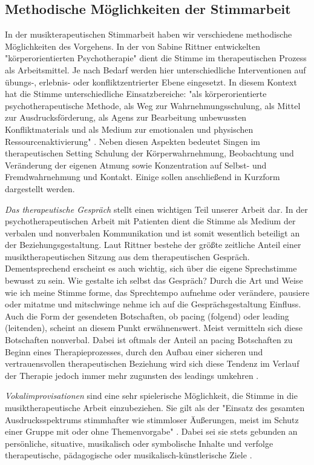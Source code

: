 \subsection{Methodische Möglichkeiten der Stimmarbeit}

In der musikterapeutischen Stimmarbeit haben wir verschiedene methodische Möglichkeiten des Vorgehens. In der von Sabine Rittner entwickelten "körperorientierten Psychotherapie" dient die Stimme im therapeutischen Prozess als Arbeitsmittel. Je nach Bedarf werden hier unterschiedliche Interventionen auf übungs-, erlebnis- oder konfliktzentrierter Ebene eingesetzt. In diesem Kontext hat die Stimme unterschiedliche Einsatzbereiche: "als körperorientierte psychotherapeutische Methode, als Weg zur Wahrnehmungsschulung, als Mittel zur Ausdrucksförderung, als Agens zur Bearbeitung unbewussten Konfliktmaterials und als Medium zur emotionalen und physischen Ressourcenaktivierung" \autocite[58]{rittner2012}. Neben diesen Aspekten bedeutet Singen im therapeutischen Setting Schulung der Körperwahrnehmung, Beobachtung und Veränderung der eigenen Atmung sowie Konzentration auf Selbst- und Fremdwahrnehmung und Kontakt.
Einige sollen anschließend in Kurzform dargestellt werden.

\emph{Das therapeutische Gespräch} stellt einen wichtigen Teil unserer Arbeit dar. In der psychotherapeutischen Arbeit mit Patienten dient die Stimme als Medium der verbalen und nonverbalen Kommunikation und ist somit wesentlich beteiligt an der Beziehungsgestaltung. Laut Rittner bestehe der größte zeitliche Anteil einer musiktherapeutischen Sitzung aus dem therapeutischen Gespräch. Dementsprechend erscheint es auch wichtig, sich über die eigene Sprechstimme bewusst zu sein. Wie gestalte ich selbst das Gespräch? Durch die Art und Weise wie ich meine Stimme forme, das Sprechtempo aufnehme oder verändere, pausiere oder mitatme und mitschwinge nehme ich auf die Gesprächsgestaltung Einfluss. Auch die Form der gesendeten Botschaften, ob pacing (folgend) oder leading (leitenden), scheint an diesem Punkt erwähnenswert. Meist vermitteln sich diese Botschaften nonverbal. Dabei ist oftmals der Anteil an pacing Botschaften zu Beginn eines Therapieprozesses, durch den Aufbau einer sicheren und vertrauensvollen therapeutischen Beziehung wird sich diese Tendenz im Verlauf der Therapie jedoch immer mehr zugunsten des leadings umkehren \autocite [vgl.][208]{rittner2008}.

\emph{Vokalimprovisationen} sind eine sehr spielerische Möglichkeit, die Stimme in die musiktherapeutische Arbeit einzubeziehen. Sie gilt als der "Einsatz des gesamten Ausdrucksspektrums stimmhafter wie stimmloser Äußerungen, meist im Schutz einer Gruppe mit oder ohne Themenvorgabe" \autocite [108]{rittner1990}. Dabei sei sie stets gebunden an persönliche, situative, musikalisch oder symbolische Inhalte und verfolge therapeutische, pädagogische oder musikalisch-künstlerische Ziele \autocite[vgl.][109]{rittner1990}. 

